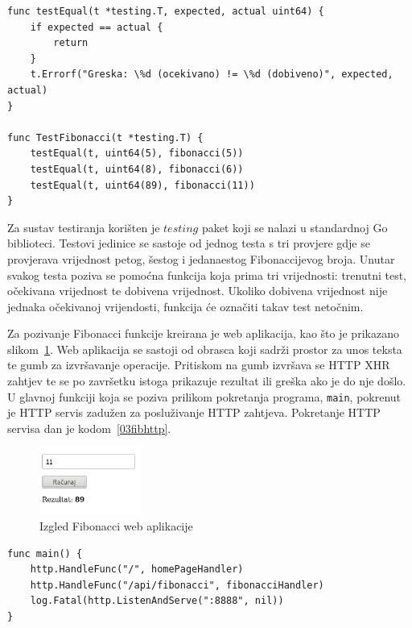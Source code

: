 \begin{lstlisting}[float=h]
func testEqual(t *testing.T, expected, actual uint64) {
	if expected == actual {
		return
	}
	t.Errorf("Greska: \%d (ocekivano) != \%d (dobiveno)", expected, actual)
}

func TestFibonacci(t *testing.T) {
	testEqual(t, uint64(5), fibonacci(5))
	testEqual(t, uint64(8), fibonacci(6))
	testEqual(t, uint64(89), fibonacci(11))
}

\end{lstlisting}

Za sustav testiranja korišten je $testing$ paket koji se nalazi u standardnoj Go biblioteci. Testovi
jedinice se sastoje od jednog testa s tri provjere gdje se provjerava vrijednost petog, šestog i
jedanaestog Fibonaccijevog broja. Unutar svakog testa poziva se pomoćna funkcija koja prima tri
vrijednosti: trenutni test, očekivana vrijednost te dobivena vrijednost. Ukoliko dobivena vrijednost
nije jednaka očekivanoj vrijendosti, funkcija će označiti takav test netočnim.

Za pozivanje Fibonacci funkcije kreirana je web aplikacija, kao što je prikazano
slikom~\ref{fig:03fibv1png}. Web aplikacija se sastoji od obrasca koji sadrži prostor za unos teksta
te gumb za izvršavanje operacije. Pritiskom na gumb izvršava se HTTP XHR zahtjev te se po završetku
istoga prikazuje rezultat ili greška ako je do nje došlo. U glavnoj funkciji koja se poziva
prilikom pokretanja programa, \texttt{main}, pokrenut je HTTP servis zadužen za posluživanje HTTP
zahtjeva. Pokretanje HTTP servisa dan je kodom~\ref{03fibhttp}.

\begin{figure}[h]
    \centering
    \includegraphics[width=0.3\textwidth]{img/03/fibonacci_html.png}
    \caption{Izgled Fibonacci web aplikacije}%
    \label{fig:03fibv1png}
\end{figure}

\begin{lstlisting}[float=h]
func main() {
	http.HandleFunc("/", homePageHandler)
	http.HandleFunc("/api/fibonacci", fibonacciHandler)
	log.Fatal(http.ListenAndServe(":8888", nil))
}
\end{lstlisting}

